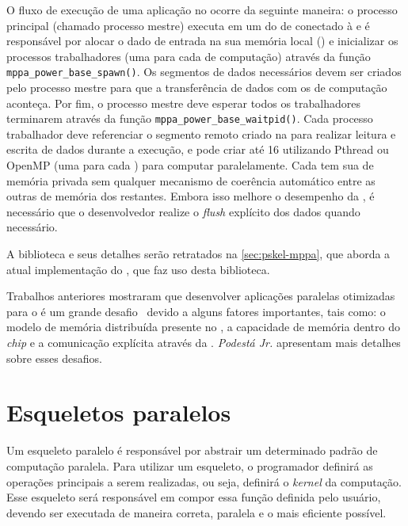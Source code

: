 O fluxo de execução de uma aplicação no \mppa ocorre da seguinte maneira: o processo principal (chamado processo mestre) executa em um \rman do \cluster de \io conectado à \lpddr e é responsável por alocar o dado de entrada na sua memória local (\lpddr) e inicializar os processos trabalhadores (uma para cada \cluster de computação) através da função \texttt{mppa\_power\_base\_spawn()}. Os segmentos de dados necessários devem ser criados pelo processo mestre para que a transferência de dados com os \clusters de computação aconteça. Por fim, o processo mestre deve esperar todos os trabalhadores terminarem através da função \texttt{mppa\_power\_base\_waitpid()}. Cada processo trabalhador deve referenciar o segmento remoto criado na \lpddr para realizar leitura e escrita de dados durante a execução, e pode criar até 16 \threads utilizando Pthread ou OpenMP (uma \thread para cada \pe) para computar paralelamente. Cada \pe tem sua \cache de memória privada sem qualquer mecanismo de coerência automático entre as outras \caches de memória dos \pes restantes. Embora isso melhore o desempenho da \cache, é necessário que o desenvolvedor realize o \textit{flush} explícito dos dados quando necessário. 

A biblioteca \ipc e seus detalhes serão retratados na \autoref{sec:pskel-mppa}, que aborda a atual implementação do \pskelmppa, que faz uso desta biblioteca.

Trabalhos anteriores mostraram que desenvolver aplicações paralelas otimizadas para o \mppa é um grande desafio~\cite{francesquini:hal-01092325} devido a alguns fatores importantes, tais como: o modelo de memória distribuída presente no \mppa, a capacidade de memória dentro do \textit{chip} e a comunicação explícita através da \noc. \textit{Podestá Jr.} \etal\cite{wscad2017} apresentam mais detalhes sobre esses desafios.


\section{Esqueletos paralelos}
\label{sec:esqueletosparalelos}

Um esqueleto paralelo é responsável por abstrair um determinado padrão de computação paralela. Para utilizar um esqueleto, o programador definirá as operações principais a serem realizadas, ou seja, definirá o \textit{kernel} da computação. Esse esqueleto será responsável em compor essa função definida pelo usuário, devendo ser executada de maneira correta, paralela e o mais eficiente possível.

